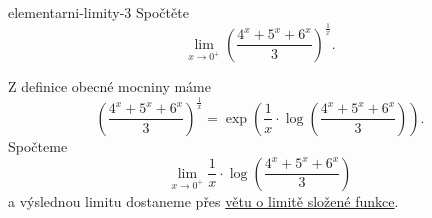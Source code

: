 \begin{problem}{}{elementarni-limity-3}
 Spočtěte
 \[
  \lim_{x \to 0^{+}} \left( \frac{4^{x} + 5^{x} + 6^{x}}{3}
  \right)^{\frac{1}{x}}.
 \]
\end{problem}
\begin{probsol}
 Z definice obecné mocniny máme
 \[
  \left( \frac{4^{x} + 5^{x} + 6^{x}}{3} \right)^{\frac{1}{x}} = \exp \left(
  \frac{1}{x} \cdot \log \left( \frac{4^{x} + 5^{x} + 6^{x}}{3} \right)
 \right).
 \]
 Spočteme
 \[
  \lim_{x \to 0^{+}} \frac{1}{x} \cdot \log \left( \frac{4^{x} + 5^{x} +
  6^{x}}{3} \right)
 \]
 a výslednou limitu dostaneme přes \hyperref[thm:limita-slozene-funkce]{větu o
 limitě složené funkce}.

\end{probsol}
